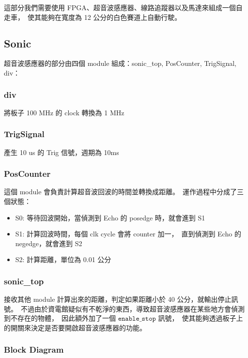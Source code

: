 \documentclass[10.5pt,compsoc,UTF8]{CjC}
\theoremstyle{mystyle}
\begin{document}
這部分我們需要使用 FPGA、超音波感應器、線路追蹤器以及馬達來組成一個自走車，\
使其能夠在寬度為 12 公分的白色賽道上自動行駛。

\subsection{Sonic}
超音波感應器的部分由四個 module 組成：sonic\_top, PosCounter, TrigSignal, div：

\subsubsection*{div}
將板子 100 MHz 的 clock 轉換為 1 MHz

\subsubsection*{TrigSignal}
產生 10 us 的 Trig 信號，週期為 10ms

\subsubsection*{PosCounter}
這個 module 會負責計算超音波回波的時間並轉換成距離。\
運作過程中分成了三個狀態：
\begin{itemize}
  \item S0: 等待回波開始，當偵測到 Echo 的 posedge 時，就會進到 S1
  \item S1: 計算回波時間，每個 clk cycle 會將 counter 加一，\
  直到偵測到 Echo 的 negedge，就會進到 S2
  \item S2: 計算距離，單位為 0.01 公分
\end{itemize}

\subsubsection*{sonic\_top}
接收其他 module 計算出來的距離，判定如果距離小於 40 公分，就輸出停止訊號。\
不過由於資電館疑似有不乾淨的東西，導致超音波感應器在某些地方會偵測到不存在的物體，\
因此額外加了一個 $\texttt{enable\_stop}$ 訊號，\
使其能夠透過板子上的開關來決定是否要開啟超音波感應器的功能。

\newpage

\subsubsection*{Block Diagram}
\end{document}
